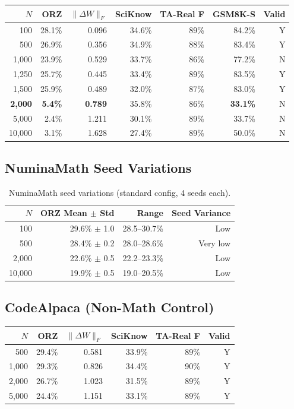 \documentclass{article}
\begin{document}
\begin{table}[h]
\centering
\small
\begin{tabular}{@{}rrrrrrr@{}}
\toprule
$N$ & ORZ & $\|\Delta W\|_F$ & SciKnow & TA-Real F & GSM8K-S & Valid \\
\midrule
100 & 28.1\% & 0.096 & 34.6\% & 89\% & 84.2\% & Y \\
500 & 26.9\% & 0.356 & 34.9\% & 88\% & 83.4\% & Y \\
1,000 & 23.9\% & 0.529 & 33.7\% & 86\% & 77.2\% & N \\
1,250 & 25.7\% & 0.445 & 33.4\% & 89\% & 83.5\% & Y \\
1,500 & 25.9\% & 0.489 & 32.0\% & 87\% & 83.0\% & Y \\
\textbf{2,000} & \textbf{5.4\%} & \textbf{0.789} & 35.8\% & 86\% & \textbf{33.1\%} & N \\
5,000 & 2.4\% & 1.211 & 30.1\% & 89\% & 33.7\% & N \\
10,000 & 3.1\% & 1.628 & 27.4\% & 89\% & 50.0\% & N \\
\bottomrule
\end{tabular}
\end{table}

\subsection{NuminaMath Seed Variations}

\begin{table}[h]
\centering
\small
\caption{NuminaMath seed variations (standard config, 4 seeds each).}
\begin{tabular}{@{}rrrr@{}}
\toprule
$N$ & ORZ Mean $\pm$ Std & Range & Seed Variance \\
\midrule
100 & 29.6\% $\pm$ 1.0 & 28.5--30.7\% & Low \\
500 & 28.4\% $\pm$ 0.2 & 28.0--28.6\% & Very low \\
2,000 & 22.6\% $\pm$ 0.5 & 22.2--23.3\% & Low \\
10,000 & 19.9\% $\pm$ 0.5 & 19.0--20.5\% & Low \\
\bottomrule
\end{tabular}
\end{table}

\subsection{CodeAlpaca (Non-Math Control)}

\begin{table}[h]
\centering
\small
\begin{tabular}{@{}rrrrrr@{}}
\toprule
$N$ & ORZ & $\|\Delta W\|_F$ & SciKnow & TA-Real F & Valid \\
\midrule
500 & 29.4\% & 0.581 & 33.9\% & 89\% & Y \\
1,000 & 29.3\% & 0.826 & 34.4\% & 90\% & Y \\
2,000 & 26.7\% & 1.023 & 31.5\% & 89\% & Y \\
5,000 & 24.4\% & 1.151 & 33.1\% & 89\% & Y \\
\bottomrule
\end{tabular}
\end{table}
\end{document}

